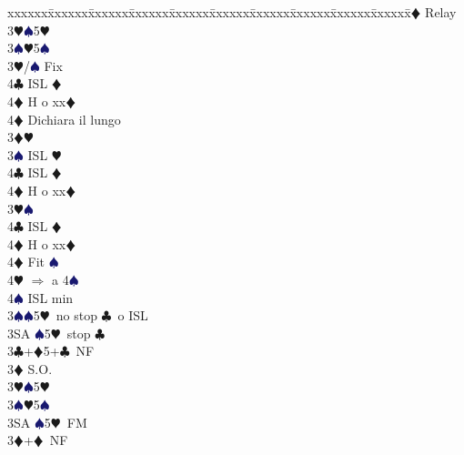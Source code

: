 \documentclass[a4paper,italian]{article}
\newcommand{\BC}{\textcolor{OliveGreen}{$\clubsuit$}}
\newcommand{\BD}{\textcolor{RedOrange}{$\vardiamondsuit$}}
\newcommand{\BH}{\textcolor{Red2}{$\varheartsuit${}}}
\newcommand{\BS}{\textcolor{MidnightBlue}{$\spadesuit${}}}
\newenvironment{bidtable}
{\begin{tabbing}

    xxxxxx\=xxxxxx\=xxxxxx\=xxxxxx\=xxxxxx\=xxxxxx\=xxxxxx\=xxxxxx\=xxxxxx\=xxxxxx\=\kill}
{\end{tabbing} }%
\begin{document}
\begin{multicols}{2}
\begin{bidtable}
                                            3\BD \> Relay\+\\
                                            3\BH {}\BS 5\BH \\
                                            3\BS {}\BH 5\BS \-\\
                                            3\BH/\BS \> Fix\\
                                            4\BC \> ISL \BD \+\\
                                            4\BD \> H o xx\BD \-\\
                                            4\BD \> Dichiara il lungo\-\\
                                            3\BD {}\BH \+\\
                                            3\BS \> ISL \BH \\
                                            4\BC \> ISL \BD \+\\
                                            4\BD \> H o xx\BD \-\-\\
                                            3\BH {}\BS \+\\
                                            4\BC \> ISL \BD \+\\
                                            4\BD \> H o xx\BD \-\\
                                            4\BD \> Fit \BS \+\\
                                            4\BH \> $\Rightarrow$ a 4\BS \+\\
                                            4\BS \> ISL min\-\-\-\\
                                            3\BS {}\BS 5\BH\ no stop \BC\ o ISL\\
                                            3SA \BS 5\BH\ stop \BC \-\\
                                            3\BC {}+\BD 5+\BC\ NF\+\\
                                            3\BD \> S.O.\\
                                            3\BH {}\BS 5\BH \\
                                            3\BS {}\BH 5\BS \\
                                            3SA \BS 5\BH\ FM\-\\
                                            3\BD {}+\BD\ NF\+\\

\end{bidtable}
\end{multicols}
\end{document}

